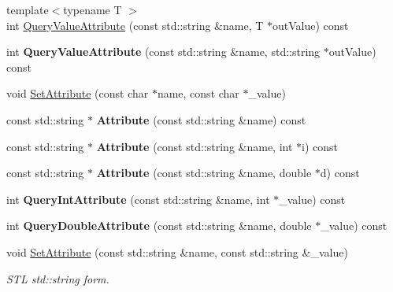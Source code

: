 \begin{DoxyCompactItemize}
{\footnotesize template$<$typename T $>$ }\\int \hyperlink{class_ti_xml_element_a7530db879b81ebaba61bf62a9770d204}{Query\+Value\+Attribute} (const std\+::string \&name, T $\ast$out\+Value) const
\item 
\hypertarget{class_ti_xml_element_aad40c4f4f34f854862e6a719e83ad713}{}\label{class_ti_xml_element_aad40c4f4f34f854862e6a719e83ad713} 
int {\bfseries Query\+Value\+Attribute} (const std\+::string \&name, std\+::string $\ast$out\+Value) const
\item 
void \hyperlink{class_ti_xml_element_abf0b3bd7f0e4c746a89ec6e7f101fc32}{Set\+Attribute} (const char $\ast$name, const char $\ast$\+\_\+value)
\item 
\hypertarget{class_ti_xml_element_aa0533e0dc704ce9f38308c9cfbe705e5}{}\label{class_ti_xml_element_aa0533e0dc704ce9f38308c9cfbe705e5} 
const std\+::string $\ast$ {\bfseries Attribute} (const std\+::string \&name) const
\item 
\hypertarget{class_ti_xml_element_a88cc395de3e5460bb96a42cb9d5ef096}{}\label{class_ti_xml_element_a88cc395de3e5460bb96a42cb9d5ef096} 
const std\+::string $\ast$ {\bfseries Attribute} (const std\+::string \&name, int $\ast$i) const
\item 
\hypertarget{class_ti_xml_element_a4f624b438f8a969df782649ea258c98b}{}\label{class_ti_xml_element_a4f624b438f8a969df782649ea258c98b} 
const std\+::string $\ast$ {\bfseries Attribute} (const std\+::string \&name, double $\ast$d) const
\item 
\hypertarget{class_ti_xml_element_aa368685cfa6efae820b8e7ec18114865}{}\label{class_ti_xml_element_aa368685cfa6efae820b8e7ec18114865} 
int {\bfseries Query\+Int\+Attribute} (const std\+::string \&name, int $\ast$\+\_\+value) const
\item 
\hypertarget{class_ti_xml_element_a442a0180263ff9a61d30711dc213d9e4}{}\label{class_ti_xml_element_a442a0180263ff9a61d30711dc213d9e4} 
int {\bfseries Query\+Double\+Attribute} (const std\+::string \&name, double $\ast$\+\_\+value) const
\item 
void \hyperlink{class_ti_xml_element_a80ed65b1d194c71c6c9986ae42337d7d}{Set\+Attribute} (const std\+::string \&name, const std\+::string \&\+\_\+value)
\begin{DoxyCompactList}\small\item\em S\+TL std\+::string form. \end{DoxyCompactList}\item 
\hypertarget{class_ti_xml_element_a6f18d54fbe25bbc527936ee65363b3c5}{}\label{class_ti_xml_element_a6f18d54fbe25bbc527936ee65363b3c5} 

\end{DoxyCompactItemize}
